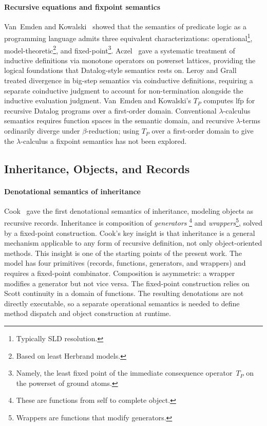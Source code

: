 \paragraph{Recursive equations and fixpoint semantics}
Van~Emden and Kowalski~\cite{vanemden1976-predicate-logic-semantics} showed that
the semantics of predicate logic as a programming language admits
three equivalent characterizations:
operational\footnote{
  Typically SLD resolution.
}, model-theoretic\footnote{
  Based on least Herbrand models.
}, and fixed-point\footnote{
  Namely, the least fixed point of the immediate consequence operator~$T_P$ on the powerset of ground atoms.
}.
Aczel~\cite{aczel1977-inductive-definitions} gave a systematic treatment of
inductive definitions via monotone operators on powerset lattices,
providing the logical foundations that Datalog-style semantics
rests on.
Leroy and Grall~\cite{leroy2006-coinductive-big-step} treated divergence
in big-step semantics via coinductive definitions,
requiring a separate coinductive judgment to account for
non-termination alongside the inductive evaluation judgment.
Van~Emden and Kowalski's $T_P$ computes
$\mathrm{lfp}$ for recursive Datalog programs over a
first-order domain.
Conventional $\lambda$-calculus semantics requires function
spaces in the semantic domain, and recursive $\lambda$-terms
ordinarily diverge under $\beta$-reduction;
using $T_P$ over a first-order domain to give the
$\lambda$-calculus a fixpoint semantics has not been explored.

\subsection{Inheritance, Objects, and Records}

\paragraph{Denotational semantics of inheritance}
Cook~\cite{cook1989-denotational-inheritance} gave the first denotational
semantics of inheritance, modeling objects as recursive records.
Inheritance is composition of \emph{generators}
\footnote{
  These are functions from self to complete object.
} and
\emph{wrappers}\footnote{
  Wrappers are functions that modify generators.
},
solved by a fixed-point construction.
Cook's key insight is that inheritance is a general mechanism
applicable to any form of recursive definition, not only
object-oriented methods. This insight is one of the starting points of the
present work.
The model has four primitives (records, functions, generators, and
wrappers) and requires a fixed-point combinator. Composition is
asymmetric: a wrapper modifies a generator but not vice versa.
The fixed-point construction relies on Scott continuity in a
domain of functions. The resulting denotations are not directly
executable, so a separate operational semantics is needed to
define method dispatch and object construction at runtime.

